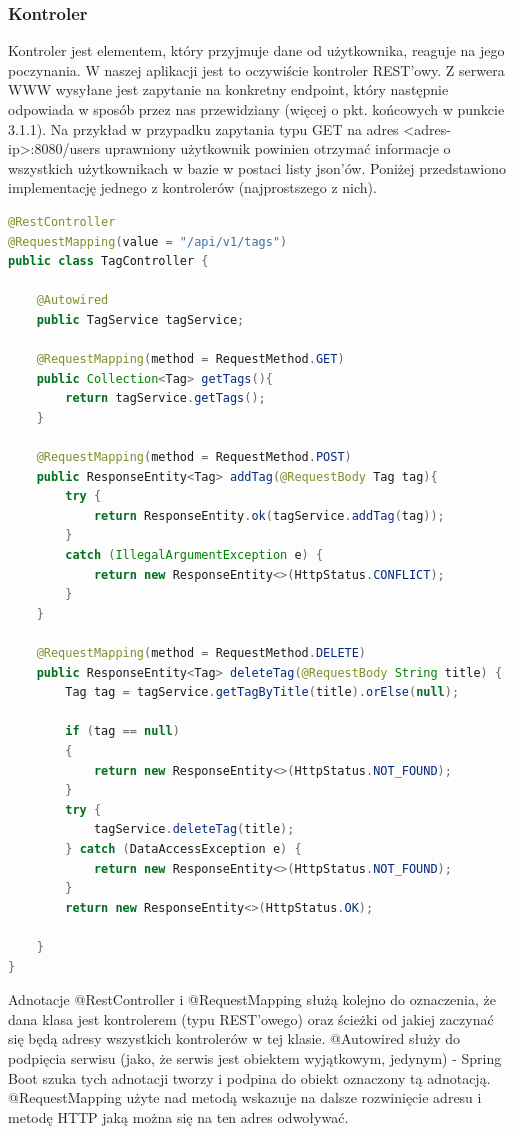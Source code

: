 \documentclass{report}
\begin{document}
			\subsubsection{Kontroler}
			
Kontroler jest elementem, który przyjmuje dane od użytkownika, reaguje na jego poczynania. W naszej aplikacji jest to oczywiście kontroler REST'owy. Z serwera WWW wysyłane jest zapytanie na konkretny endpoint, który następnie odpowiada w sposób przez nas przewidziany (więcej o pkt. końcowych w punkcie 3.1.1). Na przykład w przypadku zapytania typu GET na adres <adres-ip>:8080/users	uprawniony użytkownik powinien otrzymać informacje o wszystkich użytkownikach w bazie w postaci listy json'ów. Poniżej przedstawiono implementację jednego z kontrolerów (najprostszego z nich).


\begin{lstlisting}[language=Java, breaklines]
@RestController
@RequestMapping(value = "/api/v1/tags")
public class TagController {

    @Autowired
    public TagService tagService;

    @RequestMapping(method = RequestMethod.GET)
    public Collection<Tag> getTags(){
        return tagService.getTags();
    }

    @RequestMapping(method = RequestMethod.POST)
    public ResponseEntity<Tag> addTag(@RequestBody Tag tag){
        try {
            return ResponseEntity.ok(tagService.addTag(tag));
        }
        catch (IllegalArgumentException e) {
            return new ResponseEntity<>(HttpStatus.CONFLICT);
        }
    }

    @RequestMapping(method = RequestMethod.DELETE)
    public ResponseEntity<Tag> deleteTag(@RequestBody String title) {
        Tag tag = tagService.getTagByTitle(title).orElse(null);

        if (tag == null)
        {
            return new ResponseEntity<>(HttpStatus.NOT_FOUND);
        }
        try {
            tagService.deleteTag(title);
        } catch (DataAccessException e) {
            return new ResponseEntity<>(HttpStatus.NOT_FOUND);
        }
        return new ResponseEntity<>(HttpStatus.OK);

    }
}
\end{lstlisting}
			
Adnotacje @RestController i @RequestMapping służą kolejno do oznaczenia, że dana klasa jest kontrolerem (typu REST'owego) oraz ścieżki od jakiej zaczynać się będą adresy wszystkich kontrolerów w tej klasie. @Autowired służy do podpięcia serwisu (jako, że serwis jest obiektem wyjątkowym, jedynym) - Spring Boot szuka tych adnotacji tworzy i podpina do obiekt oznaczony tą adnotacją. @RequestMapping użyte nad metodą wskazuje na dalsze rozwinięcie adresu i metodę HTTP jaką można się na ten adres odwoływać.
\end{document}
